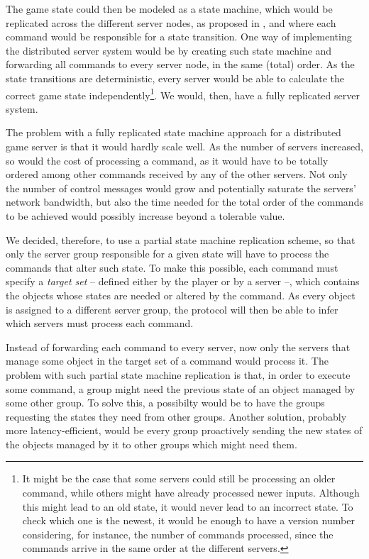 \documentclass[]{usiinfprospectus}
\begin{document}
The game state could then be modeled as a state machine, which would be replicated across the different server nodes, as proposed in \cite{lamport1978ird,schneider1990ift,lampson1996hbh}, and where each command would be responsible for a state transition. One way of implementing the distributed server system would be by creating such state machine and forwarding all commands to every server node, in the same (total) order. As the state transitions are deterministic, every server would be able to calculate the correct game state independently\footnote{It might be the case that some servers could still be processing an older command, while others might have already processed newer inputs. Although this might lead to an old state, it would never lead to an incorrect state. To check which one is the newest, it would be enough to have a version number considering, for instance, the number of commands processed, since the commands arrive in the same order at the different servers.}. We would, then, have a fully replicated server system. 

The problem with a fully replicated state machine approach for a distributed game server is that it would hardly scale well. As the number of servers increased, so would the cost of processing a command, as it would have to be totally ordered among other commands received by any of the other servers. Not only the number of control messages would grow and potentially saturate the servers' network bandwidth, but also the time needed for the total order of the commands to be achieved would possibly increase beyond a tolerable value.

We decided, therefore, to use a partial state machine replication scheme, so that only the server group responsible for a given state will have to process the commands that alter such state. To make this possible, each command must specify a \emph{target set} -- defined either by the player or by a server --, which contains the objects whose states are needed or altered by the command. As every object is assigned to a different server group, the protocol will then be able to infer which servers must process each command.

Instead of forwarding each command to every server, now only the servers that manage some object in the target set of a command would process it. The problem with such partial state machine replication is that, in order to execute some command, a group might need the previous state of an object managed by some other group. To solve this, a possibilty would be to have the groups requesting the states they need from other groups. Another solution, probably more latency-efficient, would be every group proactively sending the new states of the objects managed by it to other groups which might need them.
\end{document}
